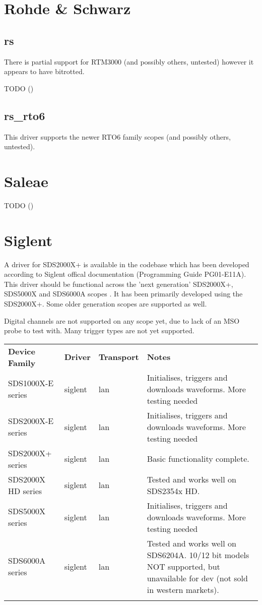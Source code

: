 \section{Rohde \& Schwarz}

\subsection{rs}

There is partial support for RTM3000 (and possibly others, untested) however it appears to have bitrotted.

TODO ()

\subsection{rs\_rto6}

This driver supports the newer RTO6 family scopes (and possibly others, untested).

\section{Saleae}
TODO ()

\section{Siglent}

A driver for SDS2000X+ is available in the codebase which has been developed according to Siglent offical documentation
(Programming Guide PG01-E11A). This driver should be functional across the 'next generation' SDS2000X+, SDS5000X and
SDS6000A scopes . It has been primarily developed using the SDS2000X+. Some older generation scopes are supported as well.

Digital channels are not supported on any scope yet, due to lack of an MSO probe to test with. Many trigger types are
not yet supported.

\begin{tabularx}{16cm}{lllX}
\thickhline
\textbf{Device Family} & \textbf{Driver} & \textbf{Transport} & \textbf{Notes} \\
\thickhline
SDS1000X-E series & siglent & lan & Initialises, triggers and downloads waveforms. More testing needed \\
\thickhline
SDS2000X-E series & siglent & lan & Initialises, triggers and downloads waveforms. More testing needed \\
\thickhline
SDS2000X+ series & siglent & lan & Basic functionality complete. \\
\thickhline
SDS2000X HD series & siglent & lan & Tested and works well on SDS2354x HD. \\
\thickhline
SDS5000X series & siglent & lan & Initialises, triggers and downloads waveforms. More testing needed \\
\thickhline
SDS6000A series & siglent & lan & Tested and works well on SDS6204A. 10/12 bit models NOT supported, but unavailable for dev (not sold in western markets). \\
\thickhline
\end{tabularx}

